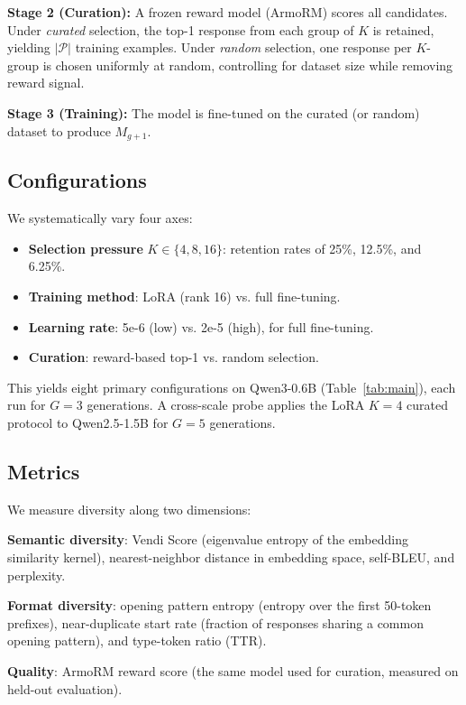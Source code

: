 \documentclass[11pt,a4paper]{article}
\begin{document}
\textbf{Stage 2 (Curation):} A frozen reward model (ArmoRM) scores all candidates. Under \textit{curated} selection, the top-1 response from each group of $K$ is retained, yielding $|\mathcal{P}|$ training examples. Under \textit{random} selection, one response per $K$-group is chosen uniformly at random, controlling for dataset size while removing reward signal.

\textbf{Stage 3 (Training):} The model is fine-tuned on the curated (or random) dataset to produce $M_{g+1}$.

\subsection{Configurations}

We systematically vary four axes:

\begin{itemize}
    \item \textbf{Selection pressure} $K \in \{4, 8, 16\}$: retention rates of 25\%, 12.5\%, and 6.25\%.
    \item \textbf{Training method}: LoRA (rank 16) vs. full fine-tuning.
    \item \textbf{Learning rate}: 5e-6 (low) vs. 2e-5 (high), for full fine-tuning.
    \item \textbf{Curation}: reward-based top-1 vs. random selection.
\end{itemize}

This yields eight primary configurations on Qwen3-0.6B (Table~\ref{tab:main}), each run for $G{=}3$ generations. A cross-scale probe applies the LoRA $K{=}4$ curated protocol to Qwen2.5-1.5B for $G{=}5$ generations.

\subsection{Metrics}

We measure diversity along two dimensions:

\textbf{Semantic diversity}: Vendi Score (eigenvalue entropy of the embedding similarity kernel), nearest-neighbor distance in embedding space, self-BLEU, and perplexity.

\textbf{Format diversity}: opening pattern entropy (entropy over the first 50-token prefixes), near-duplicate start rate (fraction of responses sharing a common opening pattern), and type-token ratio (TTR).

\textbf{Quality}: ArmoRM reward score (the same model used for curation, measured on held-out evaluation).
\end{document}
